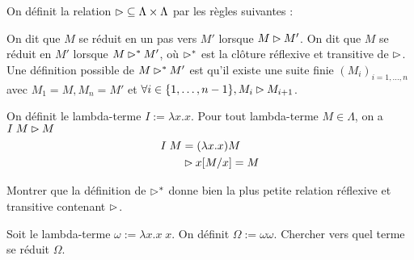 \begin{defi}
    On définit la relation $\reduc \subseteq \Lambda\times\Lambda$ par les règles suivantes :
    \begin{center}
        \begin{prooftree}
        \end{prooftree}
        \qquad
        \begin{prooftree}
        \end{prooftree}
        \qquad
        \begin{prooftree}
        \end{prooftree}

        \vspace{0.5cm}

        \begin{prooftree}
        \end{prooftree}
    \end{center}

    On dit que $M$ se réduit en un pas vers $M'$ lorsque $M\reduc M'$. On dit que $M$ se réduit en $M'$ lorsque $M\reduc^* M'$, où $\reduc^*$ est la clôture réflexive et transitive de $\reduc$. Une définition possible de $M\reduc^* M'$ est qu'il existe une suite finie $(M_i)_{i=1,\ldots,n}$ avec $M_1 = M, M_n = M'$ et $\forall i \in\{ 1,\ldots,n-1\},M_i\reduc M_{i+1}$.
\end{defi}

\begin{expl}
    On définit le lambda-terme $I := \lambda x.x$. Pour tout lambda-terme $M \in\Lambda$, on a $I\;M \reduc M$
    \begin{align*}
        I\;M &= (\lambda x.x)M\\
        &\reduc x[M/x] = M
    \end{align*}
\end{expl}

\begin{exo}
    Montrer que la définition de $\reduc^*$ donne bien la plus petite relation réflexive et transitive contenant $\reduc$.
\end{exo}

\begin{exo}
    Soit le lambda-terme $\omega := \lambda x.x\;x$. On définit $\Omega := \omega \omega$. Chercher vers quel terme se réduit $\Omega$.
\end{exo}

